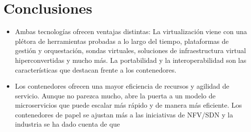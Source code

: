 \documentclass[%
 reprint,
 amsmath,amssymb,
 aps,
]{revtex4-1}
\begin{document}
\section{Conclusiones}\label{sec:6}


\begin{itemize}
	\item Ambas tecnologías ofrecen ventajas distintas:
La virtualización viene con una plétora de herramientas probadas a lo largo del tiempo, plataformas de gestión y orquestación, sondas virtuales, soluciones de infraestructura virtual hiperconvertidas y mucho más. La portabilidad y la interoperabilidad son las características que destacan frente a los contenedores.
	\item
Los contenedores ofrecen una mayor eficiencia de recursos y agilidad de servicio. Aunque no parezca mucho, abre la puerta a un modelo de microservicios que puede escalar más rápido y de manera más eficiente. Los contenedores de papel se ajustan más a las iniciativas de NFV/SDN y la industria se ha dado cuenta de que 
\end{itemize}





\end{document}
